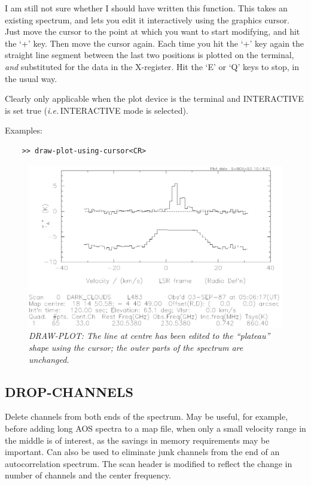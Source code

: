 \documentclass[11pt,twoside]{report}
\newcommand{\ie}{{\it i.e.\,}}
\begin{document}
I am still not sure whether I should have written this function. This
takes an existing spectrum, and lets you edit it interactively using the
graphics cursor. Just move the cursor to the point at which you want to
start modifying, and hit the `+' key. Then move the cursor again. Each time
you hit the `+' key again the straight line segment between the last two
positions is plotted on the terminal, {\em and} substituted for the data
in the X-register. Hit the `E' or `Q' keys to stop, in the usual way.

Clearly only applicable when the plot device is the terminal and
INTERACTIVE is set true (\ie INTERACTIVE mode is selected).

Examples:
\begin{verbatim}
    >> draw-plot-using-cursor<CR>
\end{verbatim}

\begin{figure}[htbp]
\begin{center}
\includegraphics[scale=0.65]{draw-plot}
\protect\parbox{5.5in}
{\caption[DRAW]
{\sl
DRAW-PLOT: The line at centre has been edited to the ``plateau'' shape
using the cursor; the outer parts of the spectrum are unchanged.
\label{DRAW}
}
}
\end{center}
\end{figure}

\subsection{DROP-CHANNELS} 

Delete channels from both ends of the spectrum. May be useful, for example,
before adding long AOS spectra to a map file, when only a small velocity
range in the middle is of interest, as the savings in memory requirements
may be important. Can also be used to eliminate junk channels
 from the end
of an autocorrelation spectrum. The scan header is modified to reflect
the change in number of channels and the center frequency.
\end{document}
